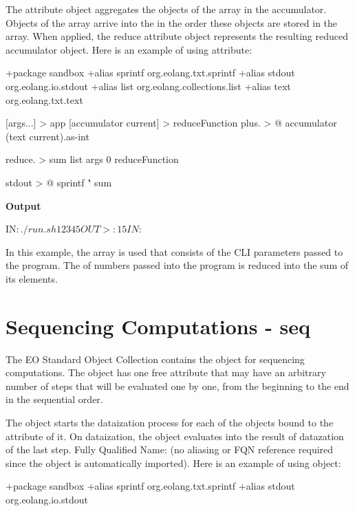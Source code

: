 \documentclass[12pt]{book}
\begin{document}
{{{The  attribute object aggregates the objects of the array in the accumulator. Objects of the array arrive into the  in the order these objects are stored in the array.
When applied, the reduce attribute object represents the resulting reduced accumulator object. Here is an example of using  attribute:

\begin{ffcode}
+package sandbox
+alias sprintf org.eolang.txt.sprintf
+alias stdout org.eolang.io.stdout
+alias list org.eolang.collections.list
+alias text org.eolang.txt.text

[args...] > app
  [accumulator current] > reduceFunction
    plus. > @
      accumulator
      (text current).as-int

  reduce. > sum
    list args
    0
    reduceFunction

  stdout > @
    sprintf
      "%
      sum

\end{ffcode}
\textbf{Output}
\begin{ffcode}

IN$: ./run.sh 1 2 3 4 5
OUT>: 15
IN$:
\end{ffcode}

In this example, the  array is used that consists of the CLI parameters passed to the program. The  of numbers passed into the program is reduced into the sum of its elements.

\section{Sequencing Computations - seq} \label{sec:seq}
The EO Standard Object Collection contains the  object for sequencing computations.
The  object has one free attribute  that may have an arbitrary number of steps that will be evaluated one by one, from the beginning to the end in the sequential order.

The  object starts the dataization process for each of the objects bound to the  attribute of it.
On dataization, the  object evaluates into the result of datazation of the last step.
Fully Qualified Name:  (no aliasing or FQN reference required since the object is automatically imported). Here is an example of using  object:

\begin{ffcode}
+package sandbox
+alias sprintf org.eolang.txt.sprintf
+alias stdout org.eolang.io.stdout


\end{ffcode}}}}
\end{document}
